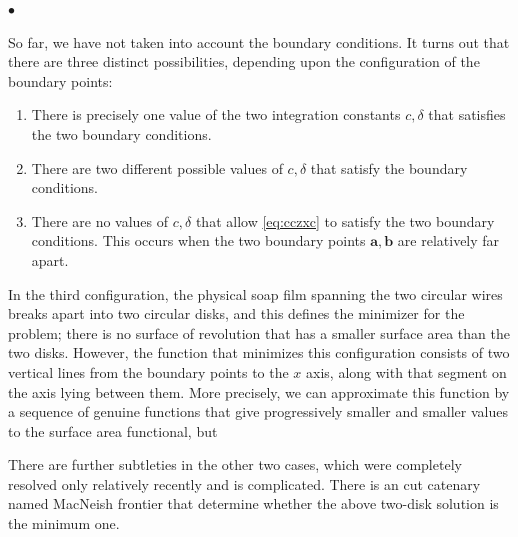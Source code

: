 \documentclass{article}
\begin{document}
$\bullet$ 

So far, we have not taken into account the boundary conditions. It turns out that there are three distinct possibilities, depending upon the configuration of the boundary points:
\begin{enumerate}
    \item There is precisely one value of the two integration constants $c, \delta$ that satisfies the two boundary conditions.
    \item There are two different possible values of $c, \delta$ that satisfy the boundary conditions.
    \item There are no values of $c, \delta$ that allow \cref{eq:cczxc} to satisfy the two boundary conditions. This occurs when the two boundary points $\mathbf{a}, \mathbf{b}$ are relatively far apart.
\end{enumerate}

In the third configuration, the physical soap film spanning the two circular wires breaks apart into two circular disks, and this defines the minimizer for the problem; there is no surface of revolution that has a smaller surface area than the two disks. However, the function that minimizes this configuration consists of two vertical lines from the boundary points to the $x$ axis, along with that segment on the axis lying between them. More precisely, we can approximate this function by a sequence of genuine functions that give progressively smaller and smaller values to the surface area functional, but 

There are further subtleties in the other two cases, which were completely resolved only relatively recently and is  complicated. There is an cut catenary named MacNeish frontier that determine  whether the above two-disk solution is the minimum one.
\end{document}
